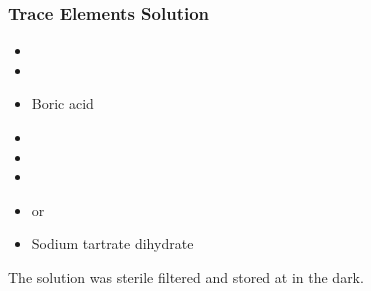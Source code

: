\subsubsection{Trace Elements Solution}
\begin{itemize}
	\item {} 
	\item {} 
	\item {} Boric acid
	\item {} 
	\item {} 
	\item {} 
	\item {}  or  
	\item {} Sodium tartrate dihydrate
\end{itemize}
The solution was sterile filtered and stored at  in the dark.

